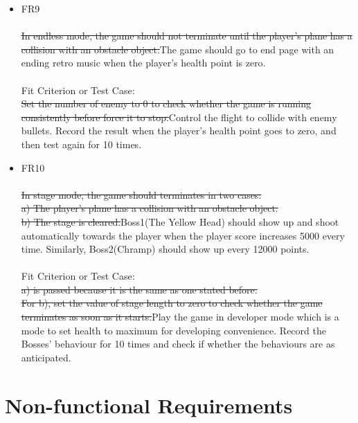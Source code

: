 \documentclass[12pt, titlepage]{article}
\begin{document}
\begin{itemize}
    \item FR9\\\\
     \sout{In endless mode, the game should not terminate until the player's plane has a collision with an obstacle object.}{\color{red}The game should go to end page with an ending retro music when the player's health point is zero.}\\\\
    Fit Criterion or Test Case:\\
    \sout{Set the number of enemy to 0 to check whether the game is running consistently before force it to stop.}{\color{red}Control the flight to collide with enemy bullets. Record the result when the player's health point goes to zero, and then test again for 10 times.}
    \item FR10\\\\
     \sout{In stage mode, the game should terminates in two cases:\\
    a) The player's plane has a collision with an obstacle object.\\
    b) The stage is cleared.}{\color{red}Boss1(The Yellow Head) should show up and shoot automatically towards the player when the player score increases 5000 every time. Similarly, Boss2(Chramp) should show up every 12000 points.}\\\\
    Fit Criterion or Test Case:\\
   \sout{ a) is passed because it is the same as one stated before.\\
    For b), set the value of stage length to zero to check whether the game terminates as soon as it starts.}{\color{red}Play the game in developer mode which is a mode to set health to maximum for developing convenience. Record the Bosses' behaviour for 10 times and check if whether the behaviours are as anticipated.}
\end{itemize}
\section{Non-functional Requirements}
\end{document}
